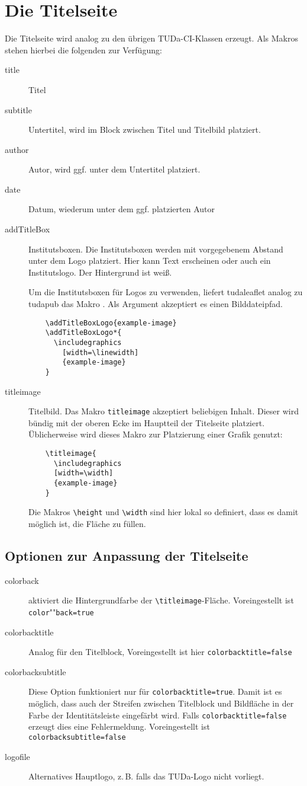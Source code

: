 \documentclass[
	color=3c,
	]{tudaleaflet}
\let\code\texttt
\let\cls\textsf
\begin{document}
\section{Die Titelseite}
Die Titelseite wird analog zu den übrigen TUDa-CI-Klassen erzeugt. Als Makros stehen hierbei die folgenden zur Verfügung:
\begin{description}
	\item[title] Titel
	\item[subtitle] Untertitel, wird im Block zwischen Titel und Titelbild platziert.
	\item[author] Autor, wird ggf. unter dem Untertitel platziert.
	\item[date] Datum, wiederum unter dem ggf. platzierten Autor
	\item[addTitleBox] Institutsboxen.
	Die Institutsboxen werden mit vorgegebenem Abstand unter dem Logo platziert. Hier kann Text erscheinen oder auch ein Institutslogo. Der Hintergrund ist weiß.
	
	Um die Institutsboxen für Logos zu verwenden, liefert \cls{tudaleaflet} analog zu \cls{tudapub} das Makro \code{\addTitleBoxLogo}. Als Argument akzeptiert es einen Bilddateipfad.
	\begin{verbatim}
	\addTitleBoxLogo{example-image}
	\addTitleBoxLogo*{
	  \includegraphics
	    [width=\linewidth]
	    {example-image}
	}
	\end{verbatim}
	\item[titleimage] Titelbild. Das Makro \code{titleimage} akzeptiert beliebigen Inhalt. Dieser wird bündig mit der oberen Ecke im Hauptteil der Titelseite platziert.
	Üblicherweise wird dieses Makro zur Platzierung einer Grafik genutzt:
	\begin{verbatim}
	\titleimage{
	  \includegraphics
	  [width=\width]
	  {example-image}
	}
	\end{verbatim}
	Die Makros \verb+\height+ und \verb+\width+ sind hier lokal so definiert, dass es damit möglich ist, die Fläche zu füllen.
\end{description}

\subsection{Optionen zur Anpassung der Titelseite}
\begin{description}
	\item[colorback] aktiviert die Hintergrundfarbe der \verb+\titleimage+-Fläche. Voreingestellt ist \verb+color+""\verb+back=true+
	\item[colorbacktitle] Analog für den Titelblock, Voreingestellt ist hier \verb+colorbacktitle=false+
	\item[colorbacksubtitle] Diese Option funktioniert nur für \verb+colorbacktitle=true+. Damit ist es möglich, dass auch der Streifen zwischen Titelblock und Bildfläche in der Farbe der Identitätsleiste eingefärbt wird. Falls \verb+colorbacktitle=false+ erzeugt dies eine Fehlermeldung. Voreingestellt ist \verb+colorbacksubtitle=false+
	\item[logofile] Alternatives Hauptlogo, z.\,B. falls das TUDa-Logo nicht vorliegt.
\end{description}
\end{document}
